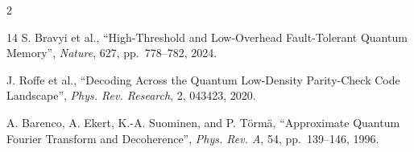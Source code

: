 \begin{multicols}{2}
\begin{thebibliography}{14}
 S. Bravyi et al., ``High-Threshold and Low-Overhead Fault-Tolerant
Quantum Memory'', \emph{Nature}, 627, pp.~778--782, 2024.

 J. Roffe et al., ``Decoding Across the Quantum Low-Density Parity-Check Code
Landscape'', \emph{Phys. Rev. Research}, 2, 043423, 2020.

 A. Barenco, A. Ekert, K.-A. Suominen, and P. Törmä,
``Approximate Quantum Fourier Transform and Decoherence'', \emph{Phys. Rev. A},
54, pp.~139--146, 1996.
\end{thebibliography}
\end{multicols}
\endgroup
